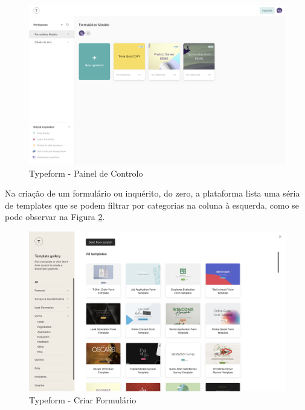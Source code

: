 \begin{figure}[ht!]
	\begin{center}
		\includegraphics[width=1\textwidth]{img/tf/tf-dashboard}
		\caption{Typeform - Painel de Controlo}
		\label{fig:tf-dashboard}
	\end{center}
\end{figure}

Na criação de um formulário ou inquérito, do zero, a plataforma lista uma séria de templates que se podem filtrar por categorias na coluna à esquerda, como se pode observar na Figura \ref{fig:tf-form-create}.

\begin{figure}[ht!]
	\begin{center}
		\includegraphics[width=1\textwidth]{img/tf/tf-form-create}
		\caption{Typeform - Criar Formulário}
		\label{fig:tf-form-create}
	\end{center}
\end{figure}
\newpage

